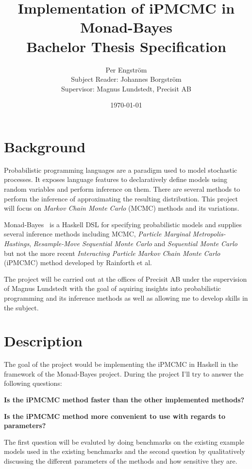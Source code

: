 \documentclass[a4paper, parskip]{scrartcl}
\title{Implementation of iPMCMC in Monad-Bayes \\ \normalfont
\Large Bachelor Thesis Specification}
\author{Per Engström \\ \small Subject Reader: Johannes Borgström \\ \small Supervisor:
  Magnus Lundstedt, Precisit AB}
\date{\today}
\begin{document}
\maketitle

\section{Background}
\label{sec:background}

Probabilistic programming languages are a paradigm used to model stochastic
processes. It exposes language features to declaratively define models using
random variables and perform inference on them. There are several methods to
perform the inference of approximating the resulting distribution. This project
will focus on \emph{Markov Chain Monte Carlo} (MCMC) methods and its variations.

Monad-Bayes~\cite{hbayes} is a Haskell DSL for specifying probabilistic models and supplies
several inference methods including MCMC, \emph{Particle Marginal
Metropolis-Hastings}, \emph{Resample-Move Sequential Monte Carlo} and
\emph{Sequential Monte Carlo} but not the more recent \emph{Interacting
Particle Markov Chain Monte Carlo} (iPMCMC) method developed by Rainforth et al.~\cite{rainforth}

The project will be carried out at the offices of Precisit AB under the
supervision of Magnus Lundstedt with the goal of aquiring insights into
probabilistic programming and its inference methods as well as allowing me to
develop skills in the subject.

\section{Description}
\label{sec:description}

The goal of the project would be implementing the iPMCMC in Haskell in the
framework of the Monad-Bayes project. During the project I'll try to answer the following questions:

\textbf{Is the iPMCMC method faster than the other implemented methods?}

\textbf{Is the iPMCMC method more convenient to use with regards to parameters?}

The first question will be evaluted by doing benchmarks on the existing example
models used in the existing benchmarks and the second question by qualitatively
discussing the different parameters of the methods and how sensitive they are.
\end{document}
